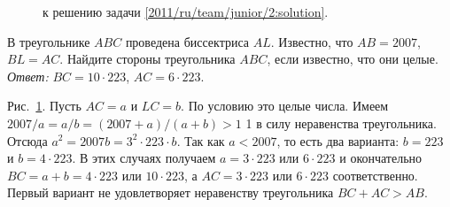 \ifsolution
\begin{figure}\centering
    \caption{к решению задачи \ref{2011/ru/team/junior/2:solution}.}
    \label{2011/ru/team/junior/2:solution:fig}
\end{figure}%
\fi %

\problem{}
В треугольнике $ABC$ проведена биссектриса $AL$.
Известно, что $AB = 2007$, $BL = AC$.
Найдите стороны треугольника $ABC$, если известно, что они целые.
\solution
\label{2011/ru/team/junior/2:solution}%
\emph{Ответ:} $BC = 10 \cdot 223$, $AC = 6 \cdot 223$.
\par
Рис.~\ref{2011/ru/team/junior/2:solution:fig}.
Пусть $AC = a$ и $LC = b$.
По условию это целые числа.
Имеем $2007 / a = a / b = (2007 + a) / (a + b) > 1$ 1 в силу неравенства
треугольника.
Отсюда $a^2 = 2007 b = 3^2 \cdot 223 \cdot b$.
Так как  $a < 2007$, то есть два варианта:
$b = 223$ и $b = 4 \cdot 223$.
В этих случаях получаем $a = 3 \cdot 223$ или $6 \cdot 223$ и окончательно
$BC = a + b = 4 \cdot 223$ или $10 \cdot 223$, а $AC = 3 \cdot 223$ или
$6 \cdot 223$ соответственно.
Первый вариант не удовлетворяет неравенству треугольника $BC + AC > AB$.
\endproblem
